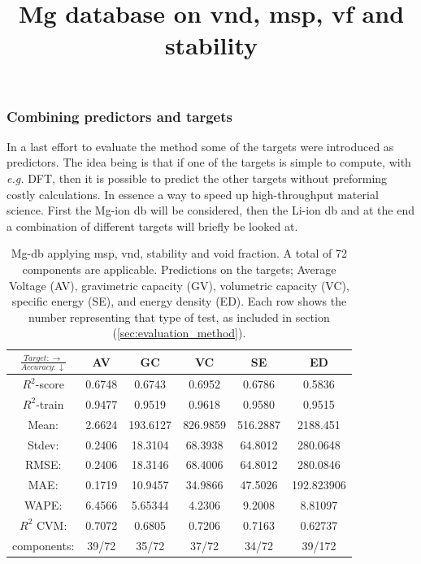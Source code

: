 \FloatBarrier
\subsubsection{Combining predictors and targets}


In a last effort to evaluate the method some of the targets were introduced as predictors. The idea being is that if one of the targets is simple to compute, with \textit{e.g.} DFT, then it is possible to predict the other targets without preforming costly calculations. In essence a way to speed up high-throughput material science. First the Mg-ion db will be considered, then the Li-ion db and at the end a combination of different targets will briefly be looked at. 


\begin{table}[h]%
\normalsize
\centering
\caption{Mg-db applying msp, vnd, stability and void fraction. A total of 72 components are applicable. Predictions on the targets; Average Voltage (AV), gravimetric capacity (GV), volumetric capacity (VC), specific energy (SE), and energy density (ED). Each row shows the number representing that type of test, as included in section (\ref{sec:evaluation_method}).}
\title{Mg database on vnd, msp, vf and stability}
\begin{tabular}{|c|c|c|c|c|c|}
	\hline 
	$\frac{Target: \rightarrow}{Accuracy:\downarrow} $ & AV & GC & VC & SE & ED 
	 \\ 
	\hline
	$R^2$-score 	& 0.6748 & 0.6743 & 0.6952 & 0.6786 &  0.5836\\ 
	\hline 
	$R^2$-train 	& 0.9477 & 0.9519 & 0.9618 & 0.9580 &  0.9515 \\ 
	\hline
	Mean: 	 	& 2.6624	&193.6127&826.9859& 516.2887& 2188.451\\
	\hline 
	Stdev:	 	& 0.2406	&18.3104	&68.3938 	&64.8012	& 280.0648\\
	\hline 
	RMSE: 		&0.2406& 18.3146 &  68.4006 & 64.8012 &280.0846\\ 
	\hline
	MAE: 		& 0.1719 & 10.9457& 34.9866 & 47.5026 & 192.823906 \\ 
	\hline
	WAPE: 		& 6.4566 & 5.65344 & 4.2306  & 9.2008 & 8.81097 \\
	\hline
	$R^2$ CVM: 	& 0.7072 	& 0.6805 	& 0.7206 &  0.7163 &0.62737 \\
	\hline
	components: 	& 39/72 	& 35/72 	& 37/72 	 & 34/72 	&39/172 \\
	\hline
\end{tabular}
\label{tab:mg-vnd-msp-vf-stability}
\end{table}



